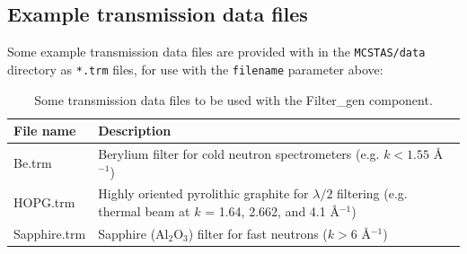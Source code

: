 \subsection*{Example transmission data files}

Some example transmission data files are provided with \MCS in the
\verb+MCSTAS/data+ directory as \verb+*.trm+ files, for use with the
\texttt{filename} parameter above:

\begin{table}[htb!]
  \begin{center}
  {\let\my=\\
    \begin{tabular}{|l|p{}|}
    \hline
    File name & Description \\
    \hline
    Be.trm       & Berylium filter for cold neutron spectrometers (e.g. $k < 1.55$  \AA$^{-1}$) \\
    HOPG.trm     & Highly oriented pyrolithic graphite for $\lambda/2$ filtering (e.g. thermal beam at $k$ = 1.64, 2.662, and 4.1 \AA$^{-1}$) \\
    Sapphire.trm & Sapphire (Al$_2$O$_3$) filter for fast neutrons ($k > 6$ \AA$^{-1}$) \\
    \hline
    \end{tabular}
    \caption{Some transmission data files to be used with the Filter\_gen component.}
    \label{t:filter-transmission-data}
  }
  \end{center}
\end{table}
